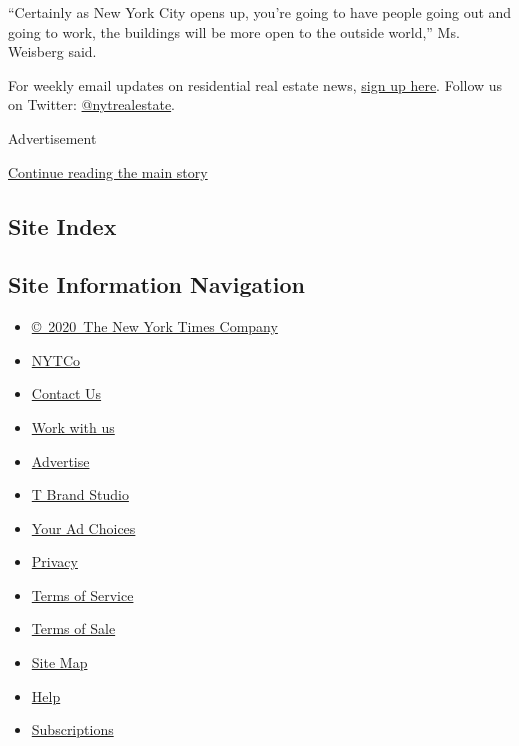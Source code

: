 ``Certainly as New York City opens up, you're going to have people going
out and going to work, the buildings will be more open to the outside
world,'' Ms. Weisberg said.

For weekly email updates on residential real estate news,
\href{http://www.nytimes.com/newsletters/realestate/}{sign up here}.
Follow us on Twitter:
\href{https://twitter.com/nytrealestate}{@nytrealestate}.

Advertisement

\protect\hyperlink{after-bottom}{Continue reading the main story}

\hypertarget{site-index}{%
\subsection{Site Index}\label{site-index}}

\hypertarget{site-information-navigation}{%
\subsection{Site Information
Navigation}\label{site-information-navigation}}

\begin{itemize}
\tightlist
\item
  \href{https://help.nytimes.com/hc/en-us/articles/115014792127-Copyright-notice}{©~2020~The
  New York Times Company}
\end{itemize}

\begin{itemize}
\tightlist
\item
  \href{https://www.nytco.com/}{NYTCo}
\item
  \href{https://help.nytimes.com/hc/en-us/articles/115015385887-Contact-Us}{Contact
  Us}
\item
  \href{https://www.nytco.com/careers/}{Work with us}
\item
  \href{https://nytmediakit.com/}{Advertise}
\item
  \href{http://www.tbrandstudio.com/}{T Brand Studio}
\item
  \href{https://www.nytimes.com/privacy/cookie-policy\#how-do-i-manage-trackers}{Your
  Ad Choices}
\item
  \href{https://www.nytimes.com/privacy}{Privacy}
\item
  \href{https://help.nytimes.com/hc/en-us/articles/115014893428-Terms-of-service}{Terms
  of Service}
\item
  \href{https://help.nytimes.com/hc/en-us/articles/115014893968-Terms-of-sale}{Terms
  of Sale}
\item
  \href{https://spiderbites.nytimes.com}{Site Map}
\item
  \href{https://help.nytimes.com/hc/en-us}{Help}
\item
  \href{https://www.nytimes.com/subscription?campaignId=37WXW}{Subscriptions}
\end{itemize}
